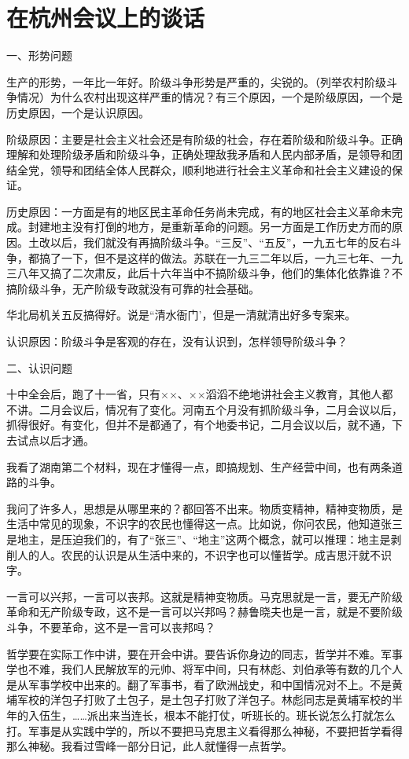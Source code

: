 \section[在杭州会议上的谈话（一九六三年五月）]{在杭州会议上的谈话}


一、形势问题

生产的形势，一年比一年好。阶级斗争形势是严重的，尖锐的。（列举农村阶级斗争情况）为什么农村出现这样严重的情况？有三个原因，一个是阶级原因，一个是历史原因，一个是认识原因。

阶级原因：主要是社会主义社会还是有阶级的社会，存在着阶级和阶级斗争。正确理解和处理阶级矛盾和阶级斗争，正确处理敌我矛盾和人民内部矛盾，是领导和团结全党，领导和团结全体人民群众，顺利地进行社会主义革命和社会主义建设的保证。

历史原因：一方面是有的地区民主革命任务尚未完成，有的地区社会主义革命未完成。封建地主没有打倒的地方，是重新革命的问题。另一方面是工作历史方而的原因。土改以后，我们就没有再搞阶级斗争。“三反”、“五反”，一九五七年的反右斗争，都搞了一下，但不是这样的做法。苏联在一九三二年以后，一九三七年、一九三八年又搞了二次肃反，此后十六年当中不搞阶级斗争，他们的集体化依靠谁？不搞阶级斗争，无产阶级专政就没有可靠的社会基础。

华北局机关五反搞得好。说是“清水衙门’，但是一清就清出好多专案来。

认识原因：阶级斗争是客观的存在，没有认识到，怎样领导阶级斗争？

二、认识问题

十中全会后，跑了十一省，只有××、××滔滔不绝地讲社会主义教育，其他人都不讲。二月会议后，情况有了变化。河南五个月没有抓阶级斗争，二月会议以后，抓得很好。有变化，但并不是都通了，有个地委书记，二月会议以后，就不通，下去试点以后才通。

我看了湖南第二个材料，现在才懂得一点，即搞规划、生产经营中间，也有两条道路的斗争。

我问了许多人，思想是从哪里来的？都回答不出来。物质变精神，精神变物质，是生活中常见的现象，不识字的农民也懂得这一点。比如说，你问农民，他知道张三是地主，是压迫我们的，有了“张三”、“地主”这两个概念，就可以推理：地主是剥削人的人。农民的认识是从生活中来的，不识字也可以懂哲学。成吉思汗就不识字。

一言可以兴邦，一言可以丧邦。这就是精神变物质。马克思就是一言，要无产阶级革命和无产阶级专政，这不是一言可以兴邦吗？赫鲁晓夫也是一言，就是不要阶级斗争，不要革命，这不是一言可以丧邦吗？

哲学要在实际工作中讲，要在开会中讲。要告诉你身边的同志，哲学并不难。军事学也不难，我们人民解放军的元帅、将军中间，只有林彪、刘伯承等有数的几个人是从军事学校中出来的。翻了军事书，看了欧洲战史，和中国情况对不上。不是黄埔军校的洋包子打败了土包子，是土包子打败了洋包子。林彪同志是黄埔军校的半年的入伍生，……派出来当连长，根本不能打仗，听班长的。班长说怎么打就怎么打。军事是从实践中学的，所以不要把马克思主义看得那么神秘，不要把哲学看得那么神秘。我看过雪峰一部分日记，此人就懂得一点哲学。

